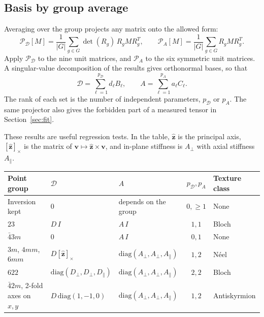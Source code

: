 \documentclass[11pt,a4paper]{article}
\numberwithin{equation}{section}
\newcommand{\vct}[1]{\bm{#1}}
\newcommand{\Dt}{\mathcal D}
\newcommand{\Pj}{\mathcal P}
\begin{document}
\subsection{Basis by group average}\label{sec:basis}

Averaging over the group projects any matrix onto the allowed form:
\begin{equation}\label{eq:project}
 \boxed{\Pj_{\Dt}[M]=\frac{1}{|G|}\sum_{g\in G}\det(R_g)\,R_gMR_g^{T},
 \qquad
 \Pj_{A}[M]=\frac{1}{|G|}\sum_{g\in G}R_gMR_g^{T}.}
\end{equation}
Apply $\Pj_{\Dt}$ to the nine unit matrices, and $\Pj_{A}$ to the six symmetric
unit matrices. A singular-value decomposition of the results gives orthonormal
bases, so that
\begin{equation}\label{eq:basis}
 \Dt=\sum_{\ell=1}^{p_{\Dt}}d_\ell B_\ell,\qquad
 A=\sum_{\ell=1}^{p_A}a_\ell C_\ell.
\end{equation}
The rank of each set is the number of independent parameters, $p_{\Dt}$ or
$p_A$. The same projector also gives the forbidden part of a measured tensor
in Section~\ref{sec:fit}.

These results are useful regression tests. In the table, $\hat{\vct z}$ is the
principal axis, $[\hat{\vct z}]_\times$ is the matrix of
$\vct v\mapsto\hat{\vct z}\times\vct v$, and in-plane stiffness is
$A_\perp$ with axial stiffness $A_\parallel$.

\Needspace{50mm}
\begin{center}
\begin{tabularx}{\textwidth}{@{}lllcY@{}}
\toprule Point group & $\Dt$ & $A$ & $p_{\Dt},p_A$ & Texture class\\\midrule
Inversion kept & $0$ & depends on the group & $0,\ge1$ & None\\
$23$ & $D\,I$ & $A\,I$ & $1,1$ & Bloch\\
$\bar43m$ & $0$ & $A\,I$ & $0,1$ & None\\
$3m$, $4mm$, $6mm$ & $D[\hat{\vct z}]_\times$ & $\mathrm{diag}(A_\perp,A_\perp,A_\parallel)$ & $1,2$ & N\'eel\\
$622$ & $\mathrm{diag}(D_\perp,D_\perp,D_\parallel)$ & $\mathrm{diag}(A_\perp,A_\perp,A_\parallel)$ & $2,2$ & Bloch\\
$\bar42m$, 2-fold axes on $x,y$ & $D\,\mathrm{diag}(1,-1,0)$ & $\mathrm{diag}(A_\perp,A_\perp,A_\parallel)$ & $1,2$ & Antiskyrmion\\
\bottomrule
\end{tabularx}
\end{center}
\end{document}
